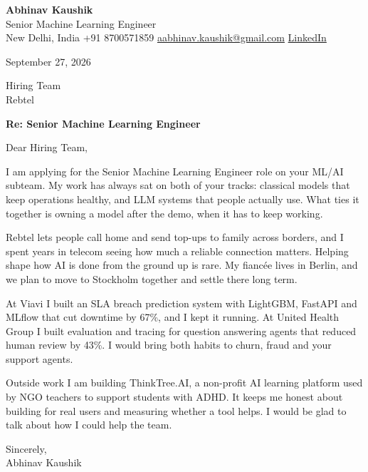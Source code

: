 \documentclass[11pt,a4paper]{article}
\begin{document}
{\Large\bfseries Abhinav Kaushik}\\
Senior Machine Learning Engineer\\
New Delhi, India \textbar{} +91 8700571859 \textbar{} \href{mailto:aabhinav.kaushik@gmail.com}{aabhinav.kaushik@gmail.com} \textbar{} \href{https://www.linkedin.com/in/abhinav-kaushik10/}{LinkedIn}  

September 27, 2026

Hiring Team\\
Rebtel

\textbf{Re: Senior Machine Learning Engineer}

Dear Hiring Team,

I am applying for the Senior Machine Learning Engineer role on your ML/AI subteam. My work has always sat on both of your tracks: classical models that keep operations healthy, and LLM systems that people actually use. What ties it together is owning a model after the demo, when it has to keep working.

Rebtel lets people call home and send top-ups to family across borders, and I spent years in telecom seeing how much a reliable connection matters. Helping shape how AI is done from the ground up is rare. My fiancée lives in Berlin, and we plan to move to Stockholm together and settle there long term.

At Viavi I built an SLA breach prediction system with LightGBM, FastAPI and MLflow that cut downtime by 67\%, and I kept it running. At United Health Group I built evaluation and tracing for question answering agents that reduced human review by 43\%. I would bring both habits to churn, fraud and your support agents.

Outside work I am building ThinkTree.AI, a non-profit AI learning platform used by NGO teachers to support students with ADHD. It keeps me honest about building for real users and measuring whether a tool helps. I would be glad to talk about how I could help the team.

Sincerely,\\[4pt]
Abhinav Kaushik
\end{document}
